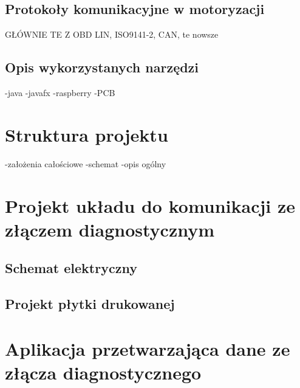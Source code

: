 \documentclass[12pt]{article} %
\numberwithin{equation}{subsection}
\numberwithin{figure}{section}
\numberwithin{table}{section}
\begin{document}
	\subsection{Protokoły komunikacyjne w motoryzacji}
		\hspace{0.5cm}GŁÓWNIE TE Z OBD LIN, ISO9141-2, CAN,
						te nowsze
	
		\newpage	
	
	\subsection{Opis wykorzystanych narzędzi}
		\hspace{0.5cm}
		-java
		-javafx
		-raspberry
		-PCB
	
		\newpage
	
\section{Struktura projektu}
	\hspace{0.5cm}
	-założenia całościowe
	-schemat
	-opis ogólny	
	
	\newpage	
	
\section{Projekt układu do komunikacji ze złączem diagnostycznym}
	\subsection{Schemat elektryczny}
		\hspace{0.5cm}
	
		\newpage
	
	\subsection{Projekt płytki drukowanej}
		\hspace{0.5cm}
	
		\newpage
	
\section{Aplikacja przetwarzająca dane ze złącza diagnostycznego}
	\hspace{0.5cm}
	
\end{document}
